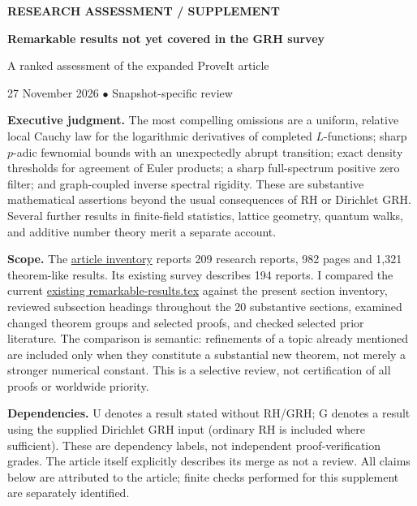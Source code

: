 \documentclass[11pt]{article}
\newcommand{\baseline}{\href{https://github.com/VladimirReshetnikov/ProveIt/blob/3c4d27a69c98d09319a51e41a19fca05bb80a3e2/Analysis/GeneralizedRiemannHypothesis/Article/remarkable-results.tex}{existing remarkable-results.tex}}
\begin{document}
{\color{teal}\large\textbf{RESEARCH ASSESSMENT \quad / \quad SUPPLEMENT}}
\vspace{5mm}

{\color{navy}\huge\bfseries Remarkable results not yet covered in the GRH survey\par}
\vspace{3mm}
{\large A ranked assessment of the expanded ProveIt article}\par
\vspace{2mm}
27 November 2026 \quad $\bullet$ \quad Snapshot-specific review
\vspace{5mm}

\textbf{Executive judgment.} The most compelling omissions are a uniform, relative local Cauchy law for the logarithmic derivatives of completed $L$-functions; sharp $p$-adic fewnomial bounds with an unexpectedly abrupt transition; exact density thresholds for agreement of Euler products; a sharp full-spectrum positive zero filter; and graph-coupled inverse spectral rigidity. These are substantive mathematical assertions beyond the usual consequences of RH or Dirichlet GRH. Several further results in finite-field statistics, lattice geometry, quantum walks, and additive number theory merit a separate account.

\textbf{Scope.} The \href{https://github.com/VladimirReshetnikov/ProveIt/blob/3c4d27a69c98d09319a51e41a19fca05bb80a3e2/Analysis/GeneralizedRiemannHypothesis/Article/README.md}{article inventory} reports 209 research reports, 982 pages and 1,321 theorem-like results. Its existing survey describes 194 reports. I compared the current \baseline{} against the present section inventory, reviewed subsection headings throughout the 20 substantive sections, examined changed theorem groups and selected proofs, and checked selected prior literature. The comparison is semantic: refinements of a topic already mentioned are included only when they constitute a substantial new theorem, not merely a stronger numerical constant. This is a selective review, not certification of all proofs or worldwide priority.

\textbf{Dependencies.} U denotes a result stated without RH/GRH; G denotes a result using the supplied Dirichlet GRH input (ordinary RH is included where sufficient). These are dependency labels, not independent proof-verification grades. The article itself explicitly describes its merge as not a review. All claims below are attributed to the article; finite checks performed for this supplement are separately identified.
\end{document}
